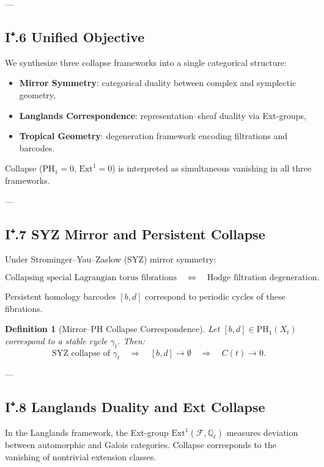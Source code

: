 \documentclass[11pt]{article}
\newtheorem{definition}[theorem]{Definition}
\begin{document}
---

\subsection*{I⁺.6 Unified Objective}

We synthesize three collapse frameworks into a single categorical structure:

\begin{itemize}
  \item \textbf{Mirror Symmetry}: categorical duality between complex and symplectic geometry,
  \item \textbf{Langlands Correspondence}: representation–sheaf duality via Ext-groups,
  \item \textbf{Tropical Geometry}: degeneration framework encoding filtrations and barcodes.
\end{itemize}

Collapse ($\mathrm{PH}_1 = 0$, $\mathrm{Ext}^1 = 0$) is interpreted as simultaneous vanishing in all three frameworks.

---

\subsection*{I⁺.7 SYZ Mirror and Persistent Collapse}

Under Strominger–Yau–Zaslow (SYZ) mirror symmetry:

\[
\text{Collapsing special Lagrangian torus fibrations} 
\quad \Longleftrightarrow \quad 
\text{Hodge filtration degeneration}.
\]

Persistent homology barcodes $[b,d]$ correspond to periodic cycles of these fibrations.

\begin{definition}[Mirror–PH Collapse Correspondence]
Let $[b,d] \in \mathrm{PH}_1(X_t)$ correspond to a stable cycle $\gamma_t$.
Then:
\[
\text{SYZ collapse of } \gamma_t 
\quad \Rightarrow \quad 
[b,d] \to \emptyset \quad \Rightarrow \quad C(t) \to 0.
\]
\end{definition}

---

\subsection*{I⁺.8 Langlands Duality and Ext Collapse}

In the Langlands framework, the Ext-group $\mathrm{Ext}^1(\mathcal{F}, \mathbb{Q}_\ell)$ measures deviation between automorphic and Galois categories.  
Collapse corresponds to the vanishing of nontrivial extension classes.
\end{document}
